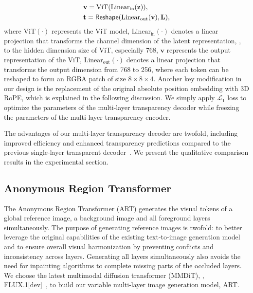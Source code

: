 \begin{align}
\vspace{-2mm}
	&\mathbf{v}   = \text{ViT}(\text{Linear}_{\text{in}}(\mathbf{z})), \\
	&\mathbf{t}   = \mathsf{Reshape}(\text{Linear}_{\text{out}}(\mathbf{v}), \mathbf{L}),
\end{align}
where $\text{ViT}(\cdot)$ represents the ViT model, $\text{Linear}_{\text{in}}(\cdot)$ denotes a linear projection that transforms the channel dimension of the latent representation, , to the hidden dimension size of ViT, especially 768, $\mathbf{v}$ represents the output representation of the ViT, $\text{Linear}_{\text{out}}(\cdot)$ denotes a linear projection that transforms the output dimension from 768 to 256, where each token can be reshaped to form an RGBA patch of size $8\times8\times4$. Another key modification in our design is the replacement of the original absolute position embedding with 3D RoPE, which is explained in the following discussion.
We simply apply $\mathcal{L}_1$ loss to optimize the parameters of the multi-layer transparency decoder while freezing the parameters of the multi-layer transparency encoder.

The advantages of our multi-layer transparency decoder are twofold, including improved efficiency and enhanced transparency predictions compared to the previous single-layer transparent decoder~\cite{zhang2024transparent}. We present the qualitative comparison results in the experimental section.

\subsection{Anonymous Region Transformer} \label{sec:method:mmdit}
The Anonymous Region Transformer (ART) generates the visual tokens of a global reference image, a background image and all foreground layers simultaneously. The purpose of generating reference images is twofold: to better leverage the original capabilities of the existing text-to-image generation model and to ensure overall visual harmonization by preventing conflicts and inconsistency across layers.
Generating all layers simultaneously also avoids the need for inpainting algorithms to complete missing parts of the occluded layers. We choose the latest multimodal diffusion transformer (MMDiT), \eg, FLUX.1[dev]~\cite{flux}, to build our variable multi-layer image generation model, ART.

